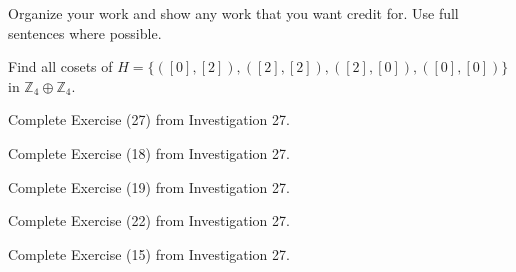 \documentclass[addpoints]{exam}
\begin{document}
Organize your work and show any work that you want credit for. Use full sentences where possible.

\begin{questions}
\question 
Find all cosets of $H=\{([0],[2]),([2],[2]),([2],[0]),([0],[0])\}$ in $\mathbb{Z}_4\oplus\mathbb{Z}_4$. 

\question 
Complete Exercise (27) from Investigation 27. 

\question 
Complete Exercise (18) from Investigation 27.

\question 
Complete Exercise (19) from Investigation 27.

\question 
Complete Exercise (22) from Investigation 27.

\question 
Complete Exercise (15) from Investigation 27.






\end{questions}
\end{document}
